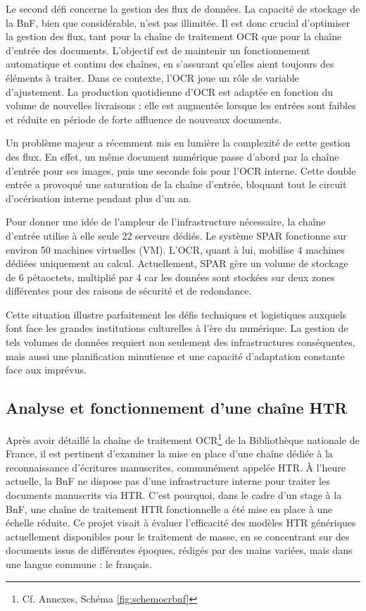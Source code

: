 \documentclass[a4paper,12pt,twoside]{book}
\begin{document}
	Le second défi concerne la gestion des flux de données. La capacité de stockage de la BnF, bien que considérable, n'est pas illimitée. Il est donc crucial d'optimiser la gestion des flux, tant pour la chaîne de traitement OCR que pour la chaîne d'entrée des documents. L'objectif est de maintenir un fonctionnement automatique et continu des chaînes, en s'assurant qu'elles aient toujours des éléments à traiter. Dans ce contexte, l'OCR joue un rôle de variable d'ajustement. La production quotidienne d'OCR est adaptée en fonction du volume de nouvelles livraisons : elle est augmentée lorsque les entrées sont faibles et réduite en période de forte affluence de nouveaux documents.
	
	Un problème majeur a récemment mis en lumière la complexité de cette gestion des flux. En effet, un même document numérique passe d'abord par la chaîne d'entrée pour ses images, puis une seconde fois pour l'OCR interne. Cette double entrée a provoqué une saturation de la chaîne d'entrée, bloquant tout le circuit d'océrisation interne pendant plus d'un an. 
	
	Pour donner une idée de l'ampleur de l'infrastructure nécessaire, la chaîne d'entrée utilise à elle seule 22 serveurs dédiés. Le système SPAR fonctionne sur environ 50 machines virtuelles (VM). L'OCR, quant à lui, mobilise 4 machines dédiées uniquement au calcul. Actuellement, SPAR gère un volume de stockage de 6 pétaoctets, multiplié par 4 car les données sont stockées sur deux zones différentes pour des raisons de sécurité et de redondance.
	
	Cette situation illustre parfaitement les défis techniques et logistiques auxquels font face les grandes institutions culturelles à l'ère du numérique. La gestion de tels volumes de données requiert non seulement des infrastructures conséquentes, mais aussi une planification minutieuse et une capacité d'adaptation constante face aux imprévus.
	
	\subsection{ Analyse et fonctionnement d’une chaîne HTR}
	
	Après avoir détaillé la chaîne de traitement OCR\footnote{Cf. Annexes, Schéma \ref*{fig:schemocrbnf}} de la Bibliothèque nationale de France, il est pertinent d’examiner la mise en place d’une chaîne dédiée à la reconnaissance d’écritures manuscrites, communément appelée HTR. À l’heure actuelle, la BnF ne dispose pas d’une infrastructure interne pour traiter les documents manuscrits via HTR. C’est pourquoi, dans le cadre d’un stage à la BnF, une chaîne de traitement HTR fonctionnelle a été mise en place à une échelle réduite. Ce projet visait à évaluer l’efficacité des modèles HTR génériques actuellement disponibles pour le traitement de masse, en se concentrant sur des documents issus de différentes époques, rédigés par des mains variées, mais dans une langue commune : le français.
	
\end{document}
